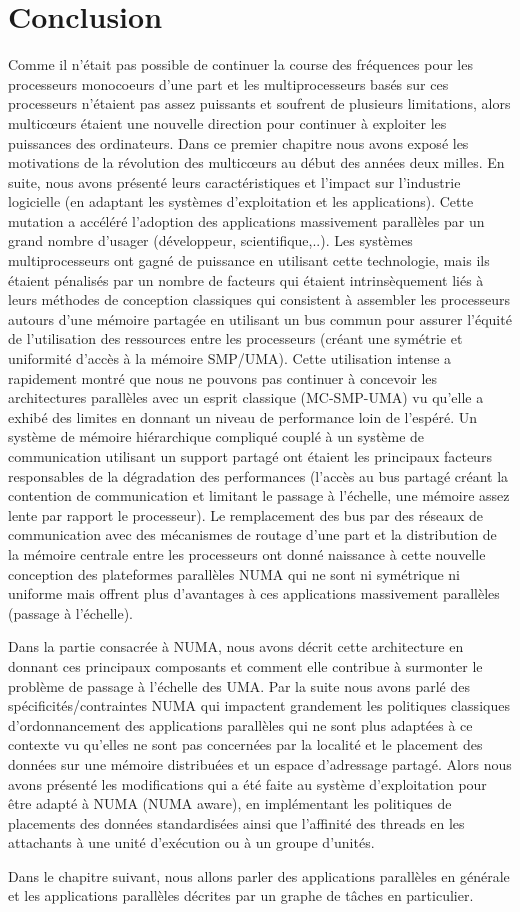 \section{Conclusion}
%
Comme il n'était pas possible de continuer la course des fréquences pour les processeurs monocoeurs d'une part et les multiprocesseurs basés sur ces processeurs n'étaient pas assez puissants et soufrent de plusieurs limitations, alors multicœurs étaient une nouvelle direction pour continuer à exploiter les puissances des ordinateurs. Dans ce premier chapitre nous avons exposé les motivations de la révolution des multicœurs au début des années deux milles. En suite, nous avons présenté leurs caractéristiques et l'impact sur l'industrie logicielle (en adaptant les systèmes d'exploitation et les applications). Cette mutation a accéléré l'adoption des applications massivement parallèles par un grand nombre d'usager (développeur, scientifique,..). 
%
Les systèmes multiprocesseurs ont gagné de puissance en utilisant cette technologie, mais ils étaient pénalisés par un nombre de facteurs qui étaient intrinsèquement liés à leurs méthodes de conception classiques qui consistent à assembler les processeurs autours d'une mémoire partagée en utilisant un bus commun pour assurer l'équité de l'utilisation des ressources entre les processeurs (créant une symétrie et uniformité d'accès à la mémoire SMP/UMA). 
%
Cette utilisation intense a rapidement montré que nous ne pouvons pas continuer à concevoir les architectures parallèles avec un esprit classique (MC-SMP-UMA) vu qu'elle a exhibé des limites en donnant un niveau de performance loin de l'espéré. Un système de mémoire hiérarchique compliqué couplé à un système de communication utilisant un support partagé ont étaient les principaux facteurs responsables de la dégradation des performances (l'accès au bus partagé créant la contention de communication et limitant le passage à l'échelle, une mémoire assez lente par rapport le processeur). 
%
Le remplacement des bus par des réseaux de communication avec des mécanismes de routage d'une part et la distribution de la mémoire centrale entre les processeurs ont donné naissance à cette nouvelle conception des plateformes parallèles NUMA qui ne sont ni symétrique ni uniforme mais offrent plus d'avantages à ces applications massivement parallèles (passage à l'échelle).

Dans la partie consacrée à NUMA, nous avons décrit cette architecture en donnant ces principaux composants et comment elle contribue à surmonter le problème de passage à l'échelle des UMA. Par la suite nous avons parlé des spécificités/contraintes NUMA qui impactent grandement les politiques classiques d'ordonnancement des applications parallèles qui ne sont plus adaptées à ce contexte vu qu'elles ne sont pas concernées par la localité et le placement des données sur une mémoire distribuées et un espace d'adressage partagé. 
Alors nous avons présenté les modifications qui a été faite au système d'exploitation pour être adapté à NUMA (NUMA aware), en implémentant les politiques de placements des données standardisées ainsi que l'affinité des threads en les attachants à une unité d'exécution ou à un groupe d'unités.

Dans le chapitre suivant, nous allons parler des applications parallèles en générale et les applications parallèles décrites par un graphe de tâches en particulier.